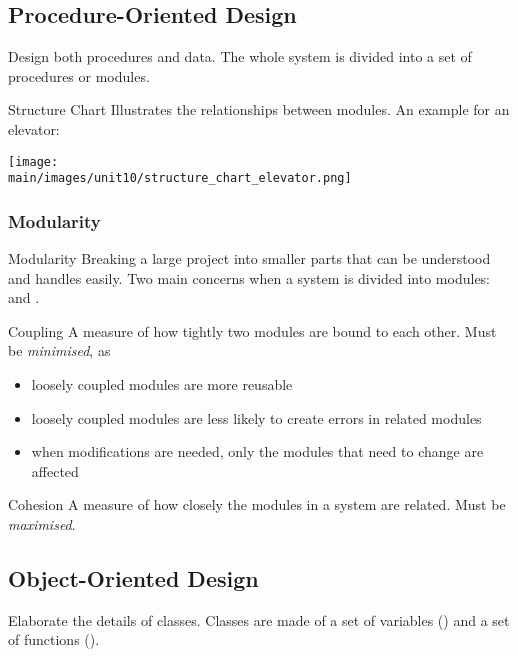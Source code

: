 \documentclass[\main/notes.tex]{subfiles}
\begin{document}
			\subsection{Procedure-Oriented Design}
				Design both procedures and data. The whole system is divided into a set of procedures or modules.
				\begin{definition}{Structure Chart}
					Illustrates the relationships between modules. An example for an elevator:
					\begin{center}
						\texttt{[image: \\main/images/unit10/structure\_chart\_elevator.png]}
					\end{center}
				\end{definition}
				\subsubsection{Modularity}
					\begin{definition}{Modularity}
						Breaking a large project into smaller parts that can be understood and handles easily. Two main concerns when a system is divided into modules:  and .
					\end{definition}
					\begin{definition}{Coupling}
						A measure of how tightly two modules are bound to each other. Must be \emph{minimised}, as
						\begin{itemize}[nosep]
							\item loosely coupled modules are more reusable
							\item loosely coupled modules are less likely to create errors in related modules
							\item when modifications are needed, only the modules that need to change are affected
						\end{itemize}
					\end{definition}
					\begin{definition}{Cohesion}
						A measure of how closely the modules in a system are related. Must be \emph{maximised}.
					\end{definition}
			\pagebreak
			\subsection{Object-Oriented Design}
				Elaborate the details of classes. Classes are made of a set of variables () and a set of functions ().
\end{document}
